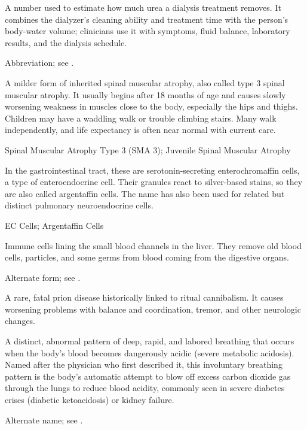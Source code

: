  A number used to estimate how much urea a dialysis treatment removes. It combines the dialyzer's cleaning ability and treatment time with the person's body-water volume; clinicians use it with symptoms, fluid balance, laboratory results, and the dialysis schedule.

 Abbreviation; see .

 A milder form of inherited spinal muscular atrophy, also called type 3 spinal muscular atrophy. It usually begins after 18 months of age and causes slowly worsening weakness in muscles close to the body, especially the hips and thighs. Children may have a waddling walk or trouble climbing stairs. Many walk independently, and life expectancy is often near normal with current care.

\synonyms
Spinal Muscular Atrophy Type 3 (SMA 3); Juvenile Spinal Muscular Atrophy

 In the gastrointestinal tract, these are serotonin-secreting
enterochromaffin cells, a type of enteroendocrine cell. Their granules react to silver-based
stains, so they are also called argentaffin cells. The name has also been used for related
but distinct pulmonary neuroendocrine cells.

\synonyms
EC Cells; Argentaffin Cells

 Immune cells lining the small blood channels in the liver. They remove old blood cells, particles, and some germs from blood coming from the digestive organs.

 Alternate form; see .

 A rare, fatal prion disease historically linked to ritual cannibalism. It causes worsening problems with balance and coordination, tremor, and other neurologic changes.

 A distinct, abnormal pattern of deep, rapid, and labored breathing that occurs when the body's blood becomes dangerously acidic (severe metabolic acidosis). Named after the physician who first described it, this involuntary breathing pattern is the body's automatic attempt to blow off excess carbon dioxide gas through the lungs to reduce blood acidity, commonly seen in severe diabetes crises (diabetic ketoacidosis) or kidney failure.

 Alternate name; see .

